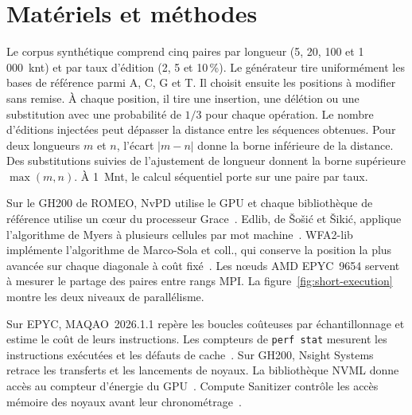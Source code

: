 


\section{Matériels et méthodes}
Le corpus synthétique comprend cinq paires par longueur (5, 20, 100 et 1\,000~knt) et par taux d’édition (2, 5 et 10\,\%). Le générateur tire uniformément les bases de référence parmi A, C, G et T. Il choisit ensuite les positions à modifier sans remise. À chaque position, il tire une insertion, une délétion ou une substitution avec une probabilité de \(1/3\) pour chaque opération. Le nombre d’éditions injectées peut dépasser la distance entre les séquences obtenues. Pour deux longueurs \(m\) et \(n\), l’écart \(\lvert m-n\rvert\) donne la borne inférieure de la distance. Des substitutions suivies de l’ajustement de longueur donnent la borne supérieure \(\max(m,n)\). À 1~Mnt, le calcul séquentiel porte sur une paire par taux.

Sur le GH200 de ROMEO, NvPD utilise le GPU et chaque bibliothèque de référence utilise un cœur du processeur Grace~\cite{romeohardware}. Edlib, de Šošić et Šikić, applique l’algorithme de Myers à plusieurs cellules par mot machine~\cite{myers,edlib,edlibcode}. WFA2-lib implémente l’algorithme de Marco-Sola et coll., qui conserve la position la plus avancée sur chaque diagonale à coût fixé~\cite{wfa,wfa2code}. Les nœuds AMD EPYC~9654 servent à mesurer le partage des paires entre rangs MPI. La figure~\ref{fig:short-execution} montre les deux niveaux de parallélisme.

Sur EPYC, MAQAO~2026.1.1 repère les boucles coûteuses par échantillonnage et estime le coût de leurs instructions. Les compteurs de \texttt{perf stat} mesurent les instructions exécutées et les défauts de cache~\cite{maqao,perfstat}. Sur GH200, Nsight Systems retrace les transferts et les lancements de noyaux. La bibliothèque NVML donne accès au compteur d’énergie du GPU~\cite{nsysdocs,nvmldocs}. Compute Sanitizer contrôle les accès mémoire des noyaux avant leur chronométrage~\cite{computesanitizer}.


